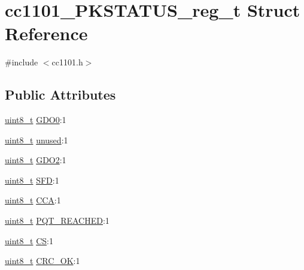 \hypertarget{structcc1101___p_k_s_t_a_t_u_s__reg__t}{}\section{cc1101\+\_\+\+P\+K\+S\+T\+A\+T\+U\+S\+\_\+reg\+\_\+t Struct Reference}
\label{structcc1101___p_k_s_t_a_t_u_s__reg__t}


{\ttfamily \#include $<$cc1101.\+h$>$}

\subsection*{Public Attributes}
\begin{DoxyCompactItemize}
\item 
\hyperlink{_p_e___types_8h_aba7bc1797add20fe3efdf37ced1182c5}{uint8\+\_\+t} \hyperlink{structcc1101___p_k_s_t_a_t_u_s__reg__t_a3d3410616219755674347e7eed5319a6}{G\+D\+O0}\+:1
\item 
\hyperlink{_p_e___types_8h_aba7bc1797add20fe3efdf37ced1182c5}{uint8\+\_\+t} \hyperlink{structcc1101___p_k_s_t_a_t_u_s__reg__t_a4e9c2a3b1591d059a29196ed4da79682}{unused}\+:1
\item 
\hyperlink{_p_e___types_8h_aba7bc1797add20fe3efdf37ced1182c5}{uint8\+\_\+t} \hyperlink{structcc1101___p_k_s_t_a_t_u_s__reg__t_a33be58164a1926c8fe3c1b3b1479085f}{G\+D\+O2}\+:1
\item 
\hyperlink{_p_e___types_8h_aba7bc1797add20fe3efdf37ced1182c5}{uint8\+\_\+t} \hyperlink{structcc1101___p_k_s_t_a_t_u_s__reg__t_a937a7423c129422a7b0480e965890324}{S\+FD}\+:1
\item 
\hyperlink{_p_e___types_8h_aba7bc1797add20fe3efdf37ced1182c5}{uint8\+\_\+t} \hyperlink{structcc1101___p_k_s_t_a_t_u_s__reg__t_ab5b5a47b53f76b080df8d1e8249e3ad4}{C\+CA}\+:1
\item 
\hyperlink{_p_e___types_8h_aba7bc1797add20fe3efdf37ced1182c5}{uint8\+\_\+t} \hyperlink{structcc1101___p_k_s_t_a_t_u_s__reg__t_a40e313549d9942d860f46f12068f68b9}{P\+Q\+T\+\_\+\+R\+E\+A\+C\+H\+ED}\+:1
\item 
\hyperlink{_p_e___types_8h_aba7bc1797add20fe3efdf37ced1182c5}{uint8\+\_\+t} \hyperlink{structcc1101___p_k_s_t_a_t_u_s__reg__t_a3fc1bc6afe984f83d2528915571d754a}{CS}\+:1
\item 
\hyperlink{_p_e___types_8h_aba7bc1797add20fe3efdf37ced1182c5}{uint8\+\_\+t} \hyperlink{structcc1101___p_k_s_t_a_t_u_s__reg__t_a9c8e0bfe32d6ff34b0ac4bd73628394e}{C\+R\+C\+\_\+\+OK}\+:1
\end{DoxyCompactItemize}


